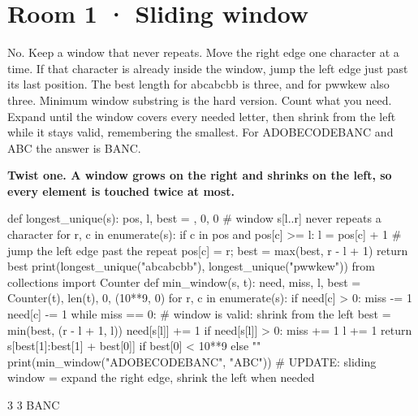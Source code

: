 \documentclass[11pt,a4paper]{report}
\begin{document}
\section*{Room 1 · Sliding window}
No. Keep a window that never repeats. Move the right edge one character at a time. If that character is already inside the window, jump the left edge just past its last position. The best length for abcabcbb is three, and for pwwkew also three. Minimum window substring is the hard version. Count what you need. Expand until the window covers every needed letter, then shrink from the left while it stays valid, remembering the smallest. For ADOBECODEBANC and ABC the answer is BANC.
\begin{tcolorbox}[colback=yellow!12,colframe=orange!70!black,boxrule=0.4pt,left=4pt,right=4pt,top=2pt,bottom=2pt]\textbf{Twist one. A window grows on the right and shrinks on the left, so every element is touched twice at most.}\end{tcolorbox}
\begin{Code}
def longest_unique(s):
    pos, l, best = {}, 0, 0                 # window s[l..r] never repeats a character
    for r, c in enumerate(s):
        if c in pos and pos[c] >= l: l = pos[c] + 1    # jump the left edge past the repeat
        pos[c] = r; best = max(best, r - l + 1)
    return best
print(longest_unique("abcabcbb"), longest_unique("pwwkew"))
from collections import Counter
def min_window(s, t):
    need, miss, l, best = Counter(t), len(t), 0, (10**9, 0)
    for r, c in enumerate(s):
        if need[c] > 0: miss -= 1
        need[c] -= 1
        while miss == 0:                    # window is valid: shrink from the left
            best = min(best, (r - l + 1, l))
            need[s[l]] += 1
            if need[s[l]] > 0: miss += 1
            l += 1
    return s[best[1]:best[1] + best[0]] if best[0] < 10**9 else ""
print(min_window("ADOBECODEBANC", "ABC"))
# UPDATE: sliding window = expand the right edge, shrink the left when needed
\end{Code}
\begin{Out}
3 3
BANC
\end{Out}
\end{document}
